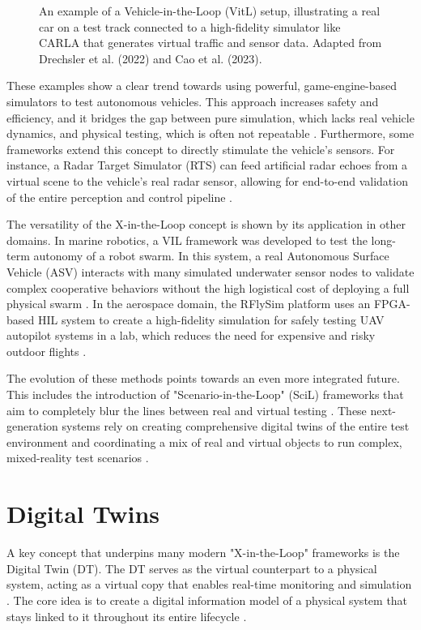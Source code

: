 \begin{figure}[h]
\centering
\caption{An example of a Vehicle-in-the-Loop (VitL) setup, illustrating a real car on a test track connected to a high-fidelity simulator like CARLA that generates virtual traffic and sensor data. Adapted from Drechsler et al. (2022) and Cao et al. (2023).}
\label{fig:vitl_setup}
\end{figure}

These examples show a clear trend towards using powerful, game-engine-based simulators to test autonomous vehicles. This approach increases safety and efficiency, and it bridges the gap between pure simulation, which lacks real vehicle dynamics, and physical testing, which is often not repeatable \cite{Cao2023}. Furthermore, some frameworks extend this concept to directly stimulate the vehicle's sensors. For instance, a Radar Target Simulator (RTS) can feed artificial radar echoes from a virtual scene to the vehicle's real radar sensor, allowing for end-to-end validation of the entire perception and control pipeline \cite{Diewald2021}.


The versatility of the X-in-the-Loop concept is shown by its application in other domains. In marine robotics, a VIL framework was developed to test the long-term autonomy of a robot swarm. In this system, a real Autonomous Surface Vehicle (ASV) interacts with many simulated underwater sensor nodes to validate complex cooperative behaviors without the high logistical cost of deploying a full physical swarm \cite{Babic2020}. In the aerospace domain, the RFlySim platform uses an FPGA-based HIL system to create a high-fidelity simulation for safely testing UAV autopilot systems in a lab, which reduces the need for expensive and risky outdoor flights \cite{Dai2021}.

The evolution of these methods points towards an even more integrated future. This includes the introduction of "Scenario-in-the-Loop" (SciL) frameworks that aim to completely blur the lines between real and virtual testing \cite{Szalay2021}. These next-generation systems rely on creating comprehensive digital twins of the entire test environment and coordinating a mix of real and virtual objects to run complex, mixed-reality test scenarios \cite{Szalay2021}.

\section{Digital Twins}
\label{sec:DT}
A key concept that underpins many modern "X-in-the-Loop" frameworks is the Digital Twin (DT). The DT serves as the virtual counterpart to a physical system, acting as a virtual copy that enables real-time monitoring and simulation \cite{AA23}. The core idea is to create a digital information model of a physical system that stays linked to it throughout its entire lifecycle \cite{Grieves2017}.

